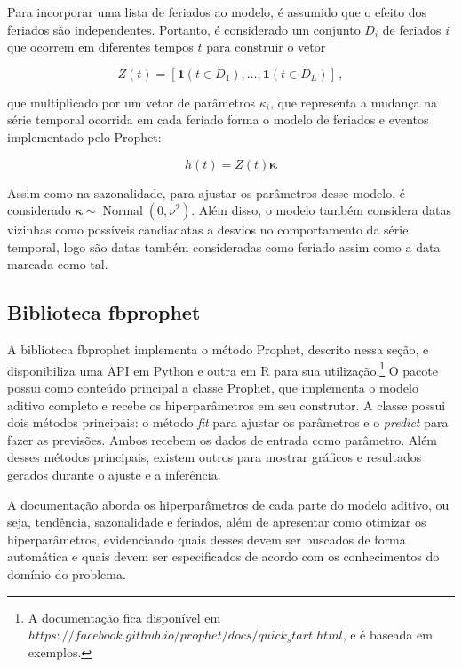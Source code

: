 Para incorporar uma lista de feriados ao modelo, é assumido que o efeito dos feriados são independentes. Portanto, é considerado um conjunto $D_{i}$ de feriados $i$ que ocorrem em diferentes tempos $t$ para construir o vetor

\begin{equation}
    Z(t)=\left[\mathbf{1}\left(t \in D_{1}\right), \ldots, \mathbf{1}\left(t \in D_{L}\right)\right] \, ,
\end{equation}

que multiplicado por um vetor de parâmetros $\kappa_{i}$, que representa a mudança na série temporal ocorrida em cada feriado forma o modelo de feriados e eventos implementado pelo Prophet:

\begin{equation}
    h(t)=Z(t) \boldsymbol{\kappa}
\end{equation}

Assim como na sazonalidade, para ajustar os parâmetros desse modelo, é considerado $\boldsymbol{\kappa} \sim \operatorname{Normal}\left(0, \nu^{2}\right) .$ Além disso, o modelo também considera datas vizinhas como possíveis candiadatas a desvios no comportamento da série temporal, logo são datas também consideradas como feriado assim como a data marcada como tal.

\subsection{Biblioteca fbprophet}
A biblioteca fbprophet implementa o método Prophet, descrito nessa seção, e disponibiliza uma API em Python e outra em R para sua utilização.\footnote{A documentação fica disponível em $https://facebook.github.io/prophet/docs/quick_start.html$, e é baseada em exemplos.} O pacote possui como conteúdo principal a classe Prophet, que implementa o modelo aditivo completo e recebe os hiperparâmetros em seu construtor. A classe possui dois métodos principais: o método \textit{fit} para ajustar os parâmetros e o \textit{predict} para fazer as previsões. Ambos recebem os dados de entrada como parâmetro. Além desses métodos principais, existem outros para mostrar gráficos e resultados gerados durante o ajuste e a inferência.

A documentação aborda os hiperparâmetros de cada parte do modelo aditivo, ou seja, tendência, sazonalidade e feriados, além de apresentar como otimizar os hiperparâmetros, evidenciando quais desses devem ser buscados de forma automática e quais devem ser especificados de acordo com os conhecimentos do domínio do problema.
